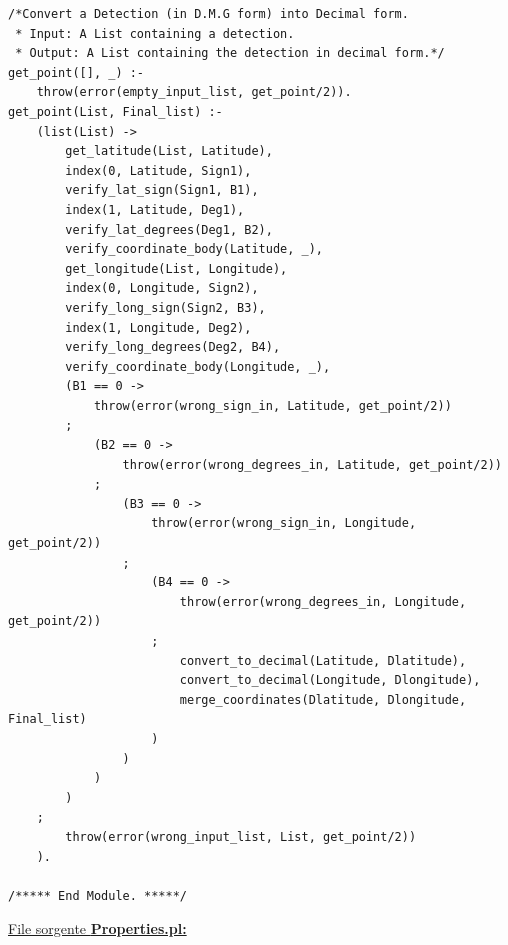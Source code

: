 \documentclass{article}
\begin{document}
\begin{lstlisting}
/*Convert a Detection (in D.M.G form) into Decimal form.
 * Input: A List containing a detection.
 * Output: A List containing the detection in decimal form.*/
get_point([], _) :-
    throw(error(empty_input_list, get_point/2)).
get_point(List, Final_list) :-
    (list(List) -> 
        get_latitude(List, Latitude),
        index(0, Latitude, Sign1),
        verify_lat_sign(Sign1, B1),
        index(1, Latitude, Deg1),
        verify_lat_degrees(Deg1, B2),
        verify_coordinate_body(Latitude, _),
        get_longitude(List, Longitude),
        index(0, Longitude, Sign2),
        verify_long_sign(Sign2, B3),
        index(1, Longitude, Deg2),
        verify_long_degrees(Deg2, B4),
        verify_coordinate_body(Longitude, _),
        (B1 == 0 ->
            throw(error(wrong_sign_in, Latitude, get_point/2))
        ;
        	(B2 == 0 -> 
        		throw(error(wrong_degrees_in, Latitude, get_point/2))
        	;
        		(B3 == 0 ->
                	throw(error(wrong_sign_in, Longitude, get_point/2))
            	;
            		(B4 == 0 ->
            			throw(error(wrong_degrees_in, Longitude, get_point/2))
            		;
            			convert_to_decimal(Latitude, Dlatitude),
                		convert_to_decimal(Longitude, Dlongitude),
                		merge_coordinates(Dlatitude, Dlongitude, Final_list)
            		)
            	)
        	)
        )
    ;
        throw(error(wrong_input_list, List, get_point/2))
    ).
    
/***** End Module. *****/
\end{lstlisting}
\underline{File sorgente \textbf{Properties.pl:}}
\lstset{language=Prolog}
\end{document}
